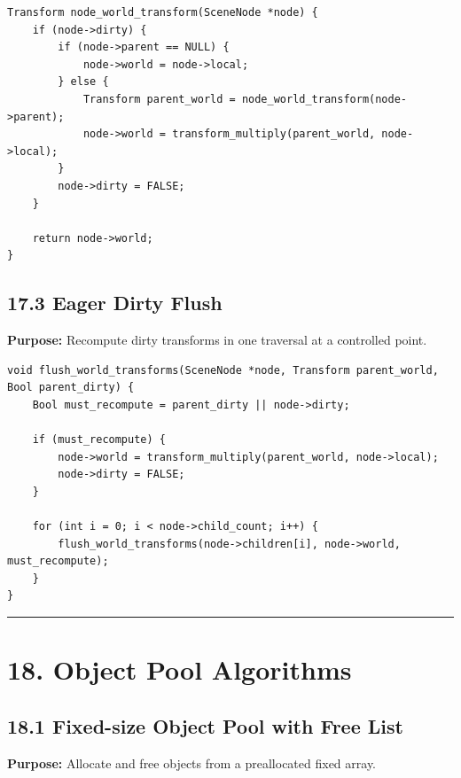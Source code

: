 \documentclass[10pt,letterpaper]{article}
\begin{document}
\begin{verbatim}
Transform node_world_transform(SceneNode *node) {
    if (node->dirty) {
        if (node->parent == NULL) {
            node->world = node->local;
        } else {
            Transform parent_world = node_world_transform(node->parent);
            node->world = transform_multiply(parent_world, node->local);
        }
        node->dirty = FALSE;
    }

    return node->world;
}
\end{verbatim}

\subsection{17.3 Eager Dirty Flush}

\textbf{Purpose:} Recompute dirty transforms in one traversal at a controlled point.

\begin{verbatim}
void flush_world_transforms(SceneNode *node, Transform parent_world, Bool parent_dirty) {
    Bool must_recompute = parent_dirty || node->dirty;

    if (must_recompute) {
        node->world = transform_multiply(parent_world, node->local);
        node->dirty = FALSE;
    }

    for (int i = 0; i < node->child_count; i++) {
        flush_world_transforms(node->children[i], node->world, must_recompute);
    }
}
\end{verbatim}

\medskip\hrule\medskip

\clearpage
\section{18. Object Pool Algorithms}

\subsection{18.1 Fixed-size Object Pool with Free List}

\textbf{Purpose:} Allocate and free objects from a preallocated fixed array.
\end{document}
